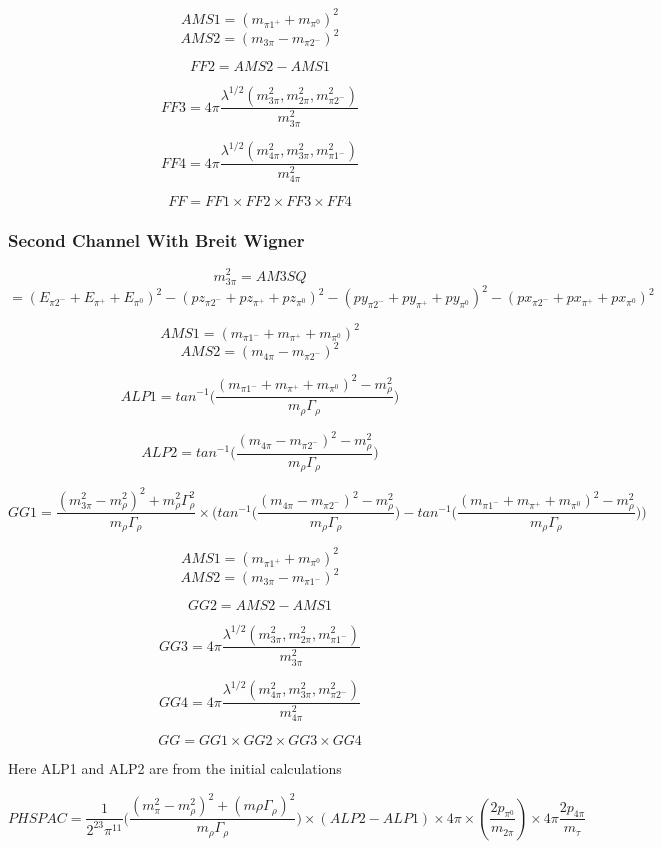 \documentclass[12pt]{article}
\begin{document}
\[AMS1 = (m_{\pi1^+} + m_{\pi^0})^2\]
\[AMS2 = (m_{3\pi}-m_{\pi2^-})^2\]


\[FF2=AMS2-AMS1\]

\[FF3 =  4\pi \frac{\lambda^{1/2}(m_{3\pi}^2, m_{2\pi}^2, m_{\pi2^-}^2)}{m_{3\pi}^2}\]

\[FF4 =  4\pi \frac{\lambda^{1/2}(m_{4\pi}^2, m_{3\pi}^2, m_{\pi1^-}^2)}{m_{4\pi}^2}\]


\[FF = FF1 \times FF2 \times FF3 \times FF4\]


\subsubsection{Second Channel With Breit Wigner}

\[m_{3\pi}^2 = AM3SQ \]
\[= (E_{\pi2^{-}}+E_{\pi^+}+E_{\pi^0})^2 - (pz_{\pi2^{-}}+pz_{\pi^+}+pz_{\pi^0})^2- (py_{\pi2^-}+py_{\pi^+}+py_{\pi^0})^2- (px_{\pi2^-}+px_{\pi^+}+px_{\pi^0})^2\]

\[AMS1 = (m_{\pi1^-} + m_{\pi^+} + m_{\pi^0})^2\]
\[AMS2 = (m_{4\pi}-m_{\pi2^-})^2\]

\[ALP1 = tan^{-1}\Big(\frac{(m_{\pi1^-} + m_{\pi^+} + m_{\pi^0})^2 - m_\rho^2}{m_\rho \Gamma_\rho}\Big)\]

\[ALP2 = tan^{-1}\Big(\frac{(m_{4\pi}-m_{\pi2^-})^2 - m_\rho^2}{m_\rho \Gamma_\rho}\Big)\]


\[GG1 = \frac{(m_{3\pi}^2 - m_\rho^2)^2 + 	m_\rho^2 \Gamma_\rho^2}{m_\rho \Gamma_\rho} \times \Bigg(tan^{-1}\Big(\frac{(m_{4\pi}-m_{\pi2^-})^2 - m_\rho^2}{m_\rho \Gamma_\rho}\Big) -  tan^{-1}\Big(\frac{(m_{\pi1^-} + m_{\pi^+} + m_{\pi^0})^2 - m_\rho^2}{m_\rho \Gamma_\rho}\Big)  \Bigg)\]


\[AMS1 = (m_{\pi1^+} + m_{\pi^0})^2\]
\[AMS2 = (m_{3\pi}-m_{\pi1^-})^2\]


\[GG2=AMS2-AMS1\]

\[GG3 =  4\pi \frac{\lambda^{1/2}(m_{3\pi}^2, m_{2\pi}^2, m_{\pi1^-}^2)}{m_{3\pi}^2}\]

\[GG4 =  4\pi \frac{\lambda^{1/2}(m_{4\pi}^2, m_{3\pi}^2, m_{\pi2^-}^2)}{m_{4\pi}^2}\]


\[GG = GG1 \times GG2 \times GG3 \times GG4\]


Here ALP1 and ALP2 are from the initial calculations

\[PHSPAC = \frac{1}{2^{23}\pi^{11}}\Big( \frac{(m_\pi^2-m_\rho^2)^2+ (m\rho \Gamma_\rho)^2}{m_\rho \Gamma_\rho}\Big) \times (ALP2-ALP1) \times 4\pi \times (\frac{2 p_{\pi^0}}{m_{2\pi}}) \times 4\pi \frac{2p_{4\pi}}{m_\tau}\]
\end{document}
